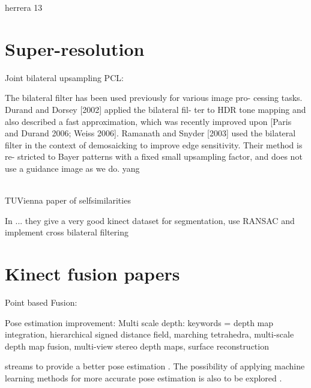 \documentclass{ucl_thesis}
\begin{document}
herrera 13





\section{Super-resolution}
\label{sec:super_resolution}

Joint bilateral upsampling PCL: \citep{Kopf:2007}

The bilateral filter has been used previously for various image pro-
cessing tasks. Durand and Dorsey [2002] applied the bilateral fil-
ter to HDR tone mapping and also described a fast approximation,
which was recently improved upon [Paris and Durand 2006; Weiss
2006].
Ramanath and Snyder [2003] used the bilateral filter in the context
of demosaicking to improve edge sensitivity. Their method is re-
stricted to Bayer patterns with a fixed small upsampling factor, and
does not use a guidance image as we do.
yang

\citep{MatsuoFI13} \\
\citep{} TUVienna paper of selfsimilarities

In \citep{Silberman:ECCV12} ... they give a very good kinect dataset for segmentation, use RANSAC and implement cross bilateral filtering

\citep{guided_filter}



\section{Kinect fusion papers}
\label{sec:kinfu}

\citep{Zhou:2013}
\citep{Chen:2013:Scalable_volumetric}
\citep{Whelan13iros}
\citep{Whelan12rssw}
Point based Fusion:
\citep{keller13realtime}

Pose estimation improvement: \citep{Whelan13icra}
Multi scale depth: \citep{Fuhrmann:2011}  keywords = depth map integration, hierarchical signed distance field, marching tetrahedra, multi-scale depth map fusion, multi-view stereo depth maps, surface reconstruction

streams to provide a better pose estimation \citep{Whelan13icra}. The possibility of applying machine learning methods for more accurate pose estimation is also to be explored \citep{malisiewicz-iccv11}.
\end{document}
